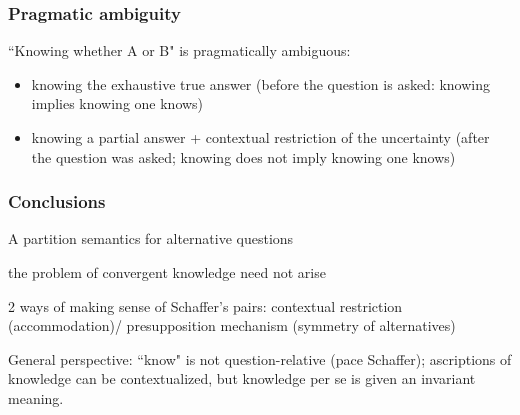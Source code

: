 \begin{frame}

\frametitle{Pragmatic ambiguity}

``Knowing whether A or B" is pragmatically ambiguous:

\begin{itemize}

\item knowing the exhaustive true answer (before the question is
asked: knowing implies knowing one knows)

\item knowing a partial answer + contextual restriction of the
uncertainty (after the question was asked; knowing does not imply
knowing one knows)


\end{itemize}


\end{frame}

\begin{frame}

\frametitle{Conclusions}

\bit

\item A partition semantics for alternative questions\pause

\item the problem of convergent knowledge need not arise\pause

\item 2 ways of making sense of Schaffer's pairs: contextual
restriction (accommodation)/ presupposition mechanism (symmetry of
alternatives)

\eit\pause

General perspective: ``know" is not question-relative (pace
Schaffer); ascriptions of knowledge can be contextualized, but
knowledge per se is given an invariant meaning.

\end{frame}
